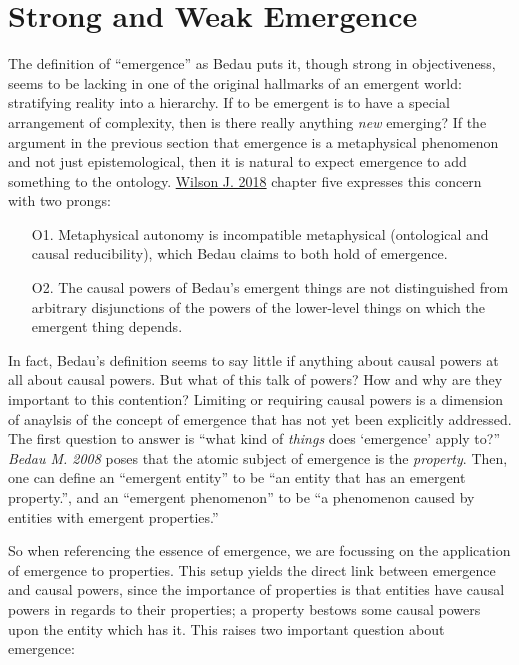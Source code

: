 \documentclass{article}
\newcommand{\ti}[1]{\textit{#1}}
\renewcommand{\cite}[1]{\hyperlink{#1}{#1}}
\begin{document}
\section{Strong and Weak Emergence}

The definition of ``emergence'' as Bedau puts it, though strong in objectiveness, seems to be lacking in one of the original hallmarks of an emergent world: stratifying reality into a hierarchy. If to be emergent is to have a special arrangement of complexity, then is there really anything \ti{new} emerging? If the argument in the previous section that emergence is a metaphysical phenomenon and not just epistemological, then it is natural to expect emergence to add something to the ontology. \cite{Wilson J. 2018} chapter five expresses this concern with two prongs:

\begin{enumerate}
    \item[O1.] Metaphysical autonomy is incompatible metaphysical (ontological and causal reducibility), which Bedau claims to both hold of emergence.
    \item[O2.] The causal powers of Bedau's emergent things are not distinguished from arbitrary disjunctions of the powers of the lower-level things on which the emergent thing depends.
\end{enumerate}


In fact, Bedau's definition seems to say little if anything about causal powers at all about causal powers. But what of this talk of powers? How and why are they important to this contention? Limiting or requiring causal powers is a dimension of anaylsis of the concept of emergence that has not yet been explicitly addressed. The first question to answer is ``what kind of \ti{things} does `emergence' apply to?'' \ti{Bedau M. 2008} poses that the atomic subject of emergence is the \ti{property}. Then, one can define an ``emergent entity'' to be ``an entity that has an emergent property.'', and an ``emergent phenomenon'' to be ``a phenomenon caused by entities with emergent properties.''

So when referencing the essence of emergence, we are focussing on the application of emergence to properties. This setup yields the direct link between emergence and causal powers, since the importance of properties is that entities have causal powers in regards to their properties; a property bestows some causal powers upon the entity which has it. This raises two important question about emergence:
\end{document}
